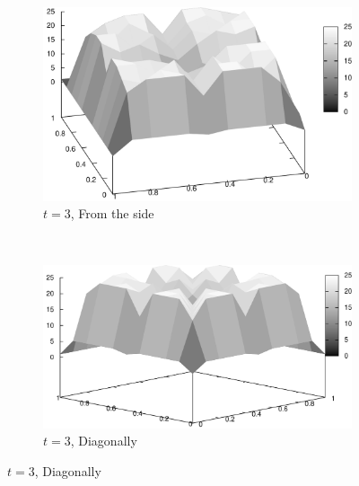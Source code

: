 \documentclass{article}
\begin{document}
	\begin{figure}
		\centering
		\begin{subfigure}[b]{0.45\textwidth}
			\centering
			\includegraphics[width=\textwidth]{images/r3_side}
			\caption{$t=3$, From the side}
			\label{fig:r3_side}
		\end{subfigure}
		~
		\begin{subfigure}[b]{0.45\textwidth}
			\centering
			\includegraphics[width=\textwidth]{images/r3_diagonal}
			\caption{$t=3$, Diagonally}
			\label{fig:r3_diagonal}
		\end{subfigure}


\end{figure}
\end{document}
